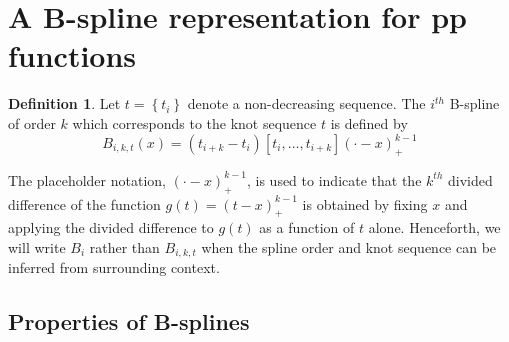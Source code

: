 \documentclass[12pt]{article}
\theoremstyle{definition}
\newtheorem{definition}{Definition}[section]
\begin{document}
\section{A B-spline representation for pp functions}

\begin{definition} \label{definition:order_k_Bspline}
Let $t= \left\{ t_i \right\}$ denote a non-decreasing sequence. The $i^{th}$ B-spline of order $k$ which corresponds to the knot sequence $t$ is defined by 
\begin{equation} \label{eq:bspline_definition}
B_{i,k,t}\left(x\right) = \left(t_{i+k}-t_i\right)\left[t_i,\dots,t_{i+k}\right]\left(\cdot -x\right)_+^{k-1}
\end{equation}
\end{definition}

The placeholder notation, $\left(\cdot - x\right)_+^{k-1}$, is used to indicate that the $k^{th}$ divided difference of the function $g\left(t \right) = \left(t-x\right)^{k-1}_+$ is obtained by fixing $x$ and applying the divided difference to $g\left(t \right)$ as a function of $t$ alone. Henceforth, we will write $B_i$ rather than $B_{i,k,t}$ when the spline order and knot sequence can be inferred from surrounding context.

\subsection{Properties of B-splines}
\end{document}
